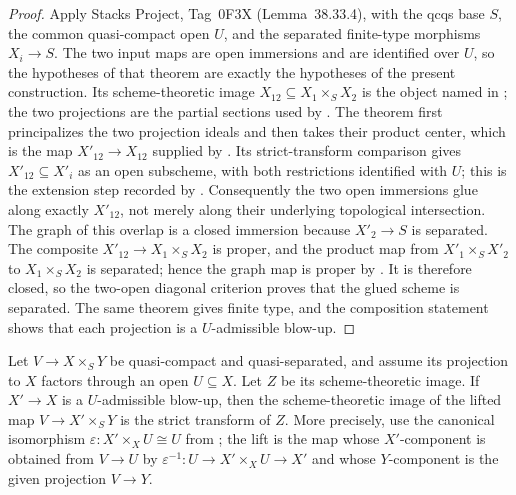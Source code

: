 \begin{proof}
  Apply Stacks Project, Tag~0F3X (Lemma~38.33.4), with the qcqs base $S$,
  the common quasi-compact open $U$, and the separated finite-type
  morphisms $X_i\to S$.  The two input maps are open immersions and are
  identified over $U$, so the hypotheses of that theorem are exactly the
  hypotheses of the present construction.  Its scheme-theoretic image
  $X_{12}\subseteq X_1\times_SX_2$ is the object named in
  ; the two projections are the partial
  sections used by
  .  The theorem first
  principalizes the two projection ideals and then takes their product
  center, which is the map $X'_{12}\to X_{12}$ supplied by
  .  Its strict-transform
  comparison gives $X'_{12}\subseteq X'_i$ as an open subscheme, with both
  restrictions identified with $U$; this is the extension step recorded by
  .  Consequently the two open
  immersions glue along exactly $X'_{12}$, not merely along their underlying
  topological intersection.  The graph of this overlap is a closed immersion
  because $X'_2\to S$ is separated.  The composite
  $X'_{12}\to X_1\times_SX_2$ is proper, and the product map from
  $X'_1\times_SX'_2$ to $X_1\times_SX_2$ is separated; hence the graph map
  is proper by
  .  It is therefore closed,
  so the two-open diagonal criterion
   proves that the glued scheme
  is separated.  The same theorem gives finite type, and the composition
  statement
   shows that each projection is a
  $U$-admissible blow-up.
\end{proof}

\begin{lemma}
  \label{lemma:nagata-scheme-image-strict-transform}

  Let $V\to X\times_SY$ be quasi-compact and quasi-separated, and assume its
  projection to $X$ factors through an open $U\subseteq X$.  Let $Z$ be its
  scheme-theoretic image.  If $X'\to X$ is a $U$-admissible blow-up, then the scheme-theoretic
  image of the lifted map $V\to X'\times_SY$ is the strict transform of $Z$.
  More precisely, use the canonical isomorphism
  $\varepsilon\colon X'\times_XU\cong U$ from
  ; the lift is the map whose
  $X'$-component is obtained from $V\to U$ by
  $\varepsilon^{-1}\colon U\to X'\times_XU\to X'$ and whose $Y$-component is
  the given projection $V\to Y$.
\end{lemma}

